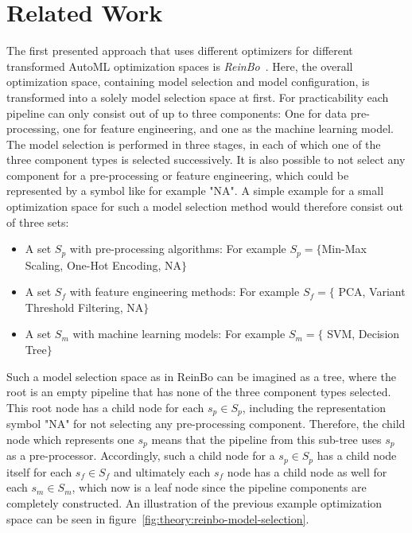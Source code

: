 \section{Related Work}
\label{sec:theory:related}
The first presented approach that uses different optimizers for different transformed AutoML optimization spaces is \textit{ReinBo}~\cite{Sun-ReinBo}.
Here, the overall optimization space, containing model selection and model configuration, is transformed into a solely model selection space at first.
For practicability each pipeline can only consist out of up to three components: One for data pre-processing, one for feature engineering, and one as the machine learning model.
The model selection is performed in three stages, in each of which one of the three component types is selected successively.
It is also possible to not select any component for a pre-processing or feature engineering, which could be represented by a symbol like for example "NA".
A simple example for a small optimization space for such a model selection method would therefore consist out of three sets:
\begin{itemize}
    \item A set $S_p$ with pre-processing algorithms: For example $S_p=\{$Min-Max Scaling, One-Hot Encoding, NA$\}$
    \item A set $S_f$ with feature engineering methods: For example $S_f=\{$ PCA, Variant Threshold Filtering, NA$\}$
    \item A set $S_m$ with machine learning models: For example $S_m=\{$ SVM, Decision Tree$\}$
\end{itemize}
Such a model selection space as in ReinBo can be imagined as a tree, where the root is an empty pipeline that has none of the three component types selected.
This root node has a child node for each $s_p \in S_p$, including the representation symbol "NA" for not selecting any pre-processing component.
Therefore, the child node which represents one $s_p$ means that the pipeline from this sub-tree uses $s_p$ as a pre-processor.
Accordingly, such a child node for a $s_p \in S_p$ has a child node itself for each $s_f \in S_f$ and ultimately each $s_f$ node has a child node as well for each $s_m \in S_m$, which now is a leaf node since the pipeline components are completely constructed.
An illustration of the previous example optimization space can be seen in figure~\ref{fig:theory:reinbo-model-selection}.
